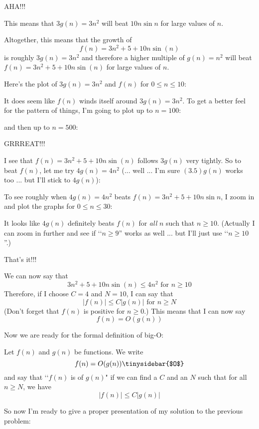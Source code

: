 AHA!!!

This means that $3g(n) = 3n^2$ will beat $10n \sin n$ for large values of $n$.

Altogether, this means that the growth of 
\[
f(n) = 3n^2 + 5 + 10 n \sin (n)
\]
is roughly $3g(n) = 3n^2$
and therefore a higher multiple of $g(n) = n^2$ will beat
$f(n) = 3n^2 + 5 + 10 n \sin (n)$ for large values of $n$.

Here's the plot of $3g(n) = 3n^2$ and $f(n)$ for $0 \leq n \leq 10$:

It does seem like $f(n)$ winds itself around $3g(n) = 3n^2$.
To get a better feel for the pattern of things, I'm going 
to plot up to $n = 100$:

and then up to $n = 500$:


GRRREAT!!!

I see that 
$f(n) = 3n^2 + 5 + 10 n \sin (n)$
follows $3g(n)$ very tightly.
So to beat $f(n)$, let me try $4g(n) = 4n^2$
(... well ... I'm sure $(3.5)g(n)$ works too ... but I'll stick to $4g(n)$):


To see roughly when $4g(n) = 4n^2$ beats 
$f(n) = 3n^2 + 5 + 10n  \sin n$, I zoom in and plot 
the graphs for $0 \leq n \leq 30$:

It looks like $4g(n)$ definitely beats $f(n)$ for \textit{all} $n$
such that $n \geq 10$.
(Actually I can zoom in further and see if \lq\lq $n \geq 9$''
works as well ... but I'll just use \lq\lq $n \geq 10$''.)

That's it!!!

We can now say that 
\[
3n^2 + 5 + 10 n \sin (n) \leq 4n^2 \text{ for $n \geq 10$}
\]
Therefore, if I choose $C = 4$ and $N = 10$, I can say that
\[
|f(n)| \leq C |g(n)| \text{ for $n \geq N$}
\]
(Don't forget that $f(n)$ is positive for $n \geq 0$.)
This means that I can now say
\[
f(n) = O(g(n))
\]

Now we are ready for the formal definition of big-O:

\begin{defn}
Let $f(n)$ and $g(n)$ be functions.
We write 
\[
f(n) = O(g(n)) \tinysidebar{$O$}
\]
and say that 
\lq\lq $f(n)$ is  of $g(n)$"
if we can find a $C$ and an $N$ such that 
for all $n \geq N$, we have
\[
|f(n)| \leq C|g(n)|
\]
\end{defn}

So now I'm ready to give a proper presentation of my solution to
the previous problem:

